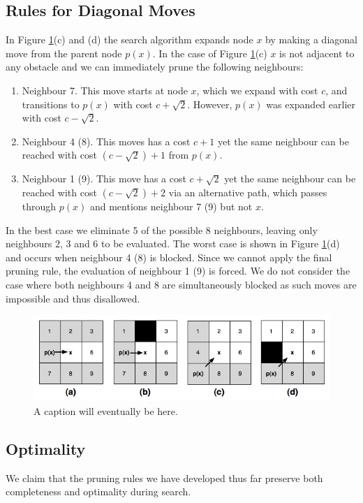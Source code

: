 \subsection{Rules for Diagonal Moves}
In Figure \ref{fig:pruningrules}(c) and (d) the search algorithm expands node
$x$ by making a diagonal move from the parent node $p(x)$.
In the case of Figure \ref{fig:pruningrules}(c) $x$ is not adjacent to any obstacle and 
we can immediately prune the following neighbours:
\begin{enumerate}
\item Neighbour 7. This move starts at node $x$, which we expand with cost $c$, and
transitions to $p(x)$ with cost $c + \sqrt2$. However, $p(x)$ was expanded earlier 
with cost $c - \sqrt2$.
\item Neighbour 4 (8). This moves has a cost $c + 1$ yet the same neighbour can be reached 
with cost $(c - \sqrt2) + 1$ from $p(x)$.
\item Neighbour 1 (9). This move has a cost $c + \sqrt2$ yet the same neighbour 
can be reached with cost $(c - \sqrt2) + 2$ via an alternative path, which passes 
through $p(x)$ and mentions neighbour 7 (9) but not $x$. 
\end{enumerate}
\noindent
In the best case we eliminate 5 of the possible 8 neighbours, leaving only
neighbours 2, 3 and 6 to be evaluated.
The worst case is shown in Figure \ref{fig:pruningrules}(d) and occurs when 
neighbour 4 (8) is blocked. Since we cannot apply the final pruning rule, 
the evaluation of neighbour 1 (9) is forced.
We do not consider the case where both neighbours 4 
and 8 are simultaneously blocked as such moves are impossible and thus
disallowed.

\begin{figure}[tb]
       \begin{center}
		   \includegraphics[scale=0.4, trim = 10mm 10mm 10mm 0mm]{diagrams/pruningrules.png}
       \end{center}
	\vspace{-3pt}
       \caption{A caption will eventually be here.}
       \label{fig:pruningrules}
\end{figure}


\subsection{Optimality}

We claim that the pruning rules we have developed thus far preserve both
completeness and optimality during search. 



